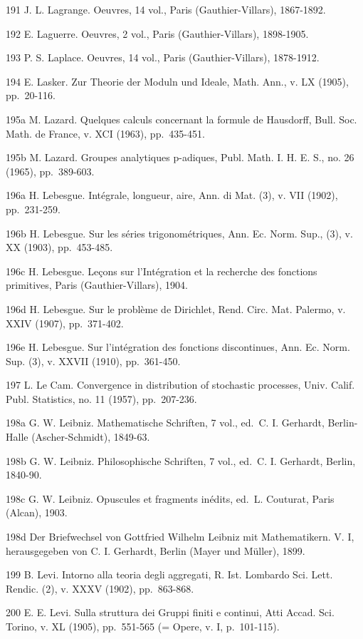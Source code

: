 191 J. L. Lagrange. Oeuvres, 14 vol., Paris (Gauthier-Villars), 1867-1892.

192 E. Laguerre. Oeuvres, 2 vol., Paris (Gauthier-Villars), 1898-1905.

193 P. S. Laplace. Oeuvres, 14 vol., Paris (Gauthier-Villars), 1878-1912.

194 E. Lasker. Zur Theorie der Moduln und Ideale, Math. Ann., v. LX (1905), pp.~20-116.

195a M. Lazard. Quelques calculs concernant la formule de Hausdorff, Bull. Soc. Math. de France, v. XCI (1963), pp.~435-451.

195b M. Lazard. Groupes analytiques p-adiques, Publ. Math. I. H. E. S., no. 26 (1965), pp.~389-603.

196a H. Lebesgue. Intégrale, longueur, aire, Ann. di Mat. (3), v. VII (1902), pp.~231-259.

196b H. Lebesgue. Sur les séries trigonométriques, Ann. Ec. Norm. Sup., (3), v. XX (1903), pp.~453-485.

196c H. Lebesgue. Leçons sur l'Intégration et la recherche des fonctions primitives, Paris (Gauthier-Villars), 1904.

196d H. Lebesgue. Sur le problème de Dirichlet, Rend. Circ. Mat. Palermo, v. XXIV (1907), pp.~371-402.

196e H. Lebesgue. Sur l'intégration des fonctions discontinues, Ann. Ec. Norm. Sup. (3), v. XXVII (1910), pp.~361-450.

197 L. Le Cam. Convergence in distribution of stochastic processes, Univ. Calif. Publ. Statistics, no. 11 (1957), pp.~207-236.

198a G. W. Leibniz. Mathematische Schriften, 7 vol., ed.~C. I. Gerhardt, Berlin-Halle (Ascher-Schmidt), 1849-63.

198b G. W. Leibniz. Philosophische Schriften, 7 vol., ed.~C. I. Gerhardt, Berlin, 1840-90.

198c G. W. Leibniz. Opuscules et fragments inédits, ed.~L. Couturat, Paris (Alcan), 1903.

198d Der Briefwechsel von Gottfried Wilhelm Leibniz mit Mathematikern. V. I, herausgegeben von C. I. Gerhardt, Berlin (Mayer und Müller), 1899.

199 B. Levi. Intorno alla teoria degli aggregati, R. Ist. Lombardo Sci. Lett. Rendic. (2), v. XXXV (1902), pp.~863-868.

200 E. E. Levi. Sulla struttura dei Gruppi finiti e continui, Atti Accad. Sci. Torino, v. XL (1905), pp.~551-565 (= Opere, v. I, p.~101-115).

